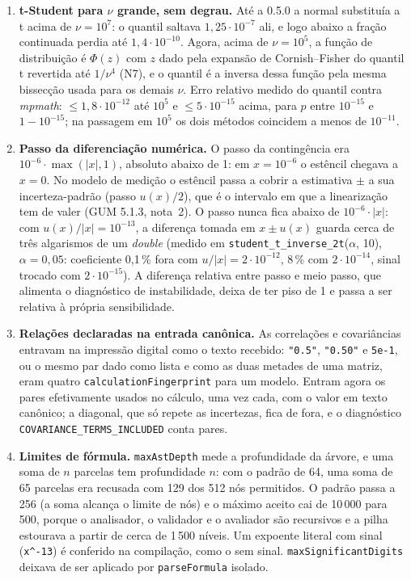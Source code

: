 \documentclass[11pt,a4paper]{article}
\newcommand{\previousVersion}{0.5.0}
\begin{document}
\begin{enumerate}[label=(\alph*)]
  \item \textbf{t-Student para \(\nu\) grande, sem degrau.} Até a \previousVersion{} a normal substituía a t acima de \(\nu = 10^7\): o quantil saltava \(1{,}25 \cdot 10^{-7}\) ali, e logo abaixo a fração continuada perdia até \(1{,}4 \cdot 10^{-10}\). Agora, acima de \(\nu = 10^5\), a função de distribuição é \(\Phi(z)\) com \(z\) dado pela expansão de Cornish--Fisher do quantil t revertida até \(1/\nu^4\) (N7), e o quantil é a inversa dessa função pela mesma bissecção usada para os demais \(\nu\). Erro relativo medido do quantil contra \emph{mpmath}: \(\leq 1{,}8 \cdot 10^{-12}\) até \(10^5\) e \(\leq 5 \cdot 10^{-15}\) acima, para \(p\) entre \(10^{-15}\) e \(1 - 10^{-15}\); na passagem em \(10^5\) os dois métodos coincidem a menos de \(10^{-11}\).
  \item \textbf{Passo da diferenciação numérica.} O passo da contingência era \(10^{-6} \cdot \max(|x|, 1)\), absoluto abaixo de 1: em \(x = 10^{-6}\) o estêncil chegava a \(x = 0\). No modelo de medição o estêncil passa a cobrir a estimativa \(\pm\) a sua incerteza-padrão (passo \(u(x)/2\)), que é o intervalo em que a linearização tem de valer (GUM 5.1.3, nota~2). O passo nunca fica abaixo de \(10^{-6} \cdot |x|\): com \(u(x)/|x| = 10^{-13}\), a diferença tomada em \(x \pm u(x)\) guarda cerca de três algarismos de um \emph{double} (medido em \texttt{student\_t\_inverse\_2t}(\(\alpha\), 10), \(\alpha = 0{,}05\): coeficiente 0{,}1\,\% fora com \(u/|x| = 2 \cdot 10^{-12}\), 8\,\% com \(2 \cdot 10^{-14}\), sinal trocado com \(2 \cdot 10^{-15}\)). A diferença relativa entre passo e meio passo, que alimenta o diagnóstico de instabilidade, deixa de ter piso de 1 e passa a ser relativa à própria sensibilidade.
  \item \textbf{Relações declaradas na entrada canônica.} As correlações e covariâncias entravam na impressão digital como o texto recebido: \texttt{"0.5"}, \texttt{"0.50"} e \texttt{5e-1}, ou o mesmo par dado como lista e como as duas metades de uma matriz, eram quatro \texttt{calculationFingerprint} para um modelo. Entram agora os pares efetivamente usados no cálculo, uma vez cada, com o valor em texto canônico; a diagonal, que só repete as incertezas, fica de fora, e o diagnóstico \texttt{COVARIANCE\_TERMS\_INCLUDED} conta pares.
  \item \textbf{Limites de fórmula.} \texttt{maxAstDepth} mede a profundidade da árvore, e uma soma de \(n\) parcelas tem profundidade \(n\): com o padrão de 64, uma soma de 65 parcelas era recusada com 129 dos 512 nós permitidos. O padrão passa a 256 (a soma alcança o limite de nós) e o máximo aceito cai de 10\,000 para 500, porque o analisador, o validador e o avaliador são recursivos e a pilha estourava a partir de cerca de 1\,500 níveis. Um expoente literal com sinal (\texttt{x\^{}-13}) é conferido na compilação, como o sem sinal. \texttt{maxSignificantDigits} deixava de ser aplicado por \texttt{parseFormula} isolado.

\end{enumerate}
\end{document}

